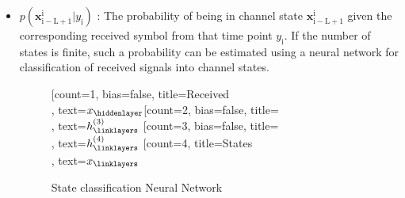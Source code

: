 \documentclass[12pt,a4paper]{report}
\begin{document}
\begin{itemize}
\item $p(\mathbf{x}_{\mathrm{i-L+1}}^{\mathrm{i}}|y_{\mathrm{i}})$
: The probability of being in channel state $\mathbf{x}_{\mathrm{i-L+1}}^{\mathrm{i}}$ given the corresponding received symbol from that time point $y_{\mathrm{i}}$. If the number of states is finite, such a probability can be estimated using a neural network for classification of received signals into channel states. 
	\begin{figure}[H]
	\centering
		\begin{neuralnetwork}[height=4, nodespacing=10mm, layerspacing=15mm]
		\newcommand{\x}[2]{$x_#2$}
		\newcommand{\y}[2]{$\hat{y}_#2$}
		\newcommand{\hfirst}[2]{\small $h^{(1)}_#2$}
		\newcommand{\hsecond}[2]{\small $h^{(2)}_#2$}
		\newcommand{\hthird}[2]{\small $h^{(3)}_#2$}
		\newcommand{\hfourth}[2]{\small $h^{(4)}_#2$}
		[count=1, bias=false, title=Received\\, text=\x]
		\hiddenlayer[count=2, bias=false, title=\\, text=\hthird] \linklayers
		\hiddenlayer[count=3, bias=false, title=\\, text=\hfourth] \linklayers
		\outputlayer[count=4, title=States\\, text=\x] \linklayers
	    \end{neuralnetwork}
	    	  	  \caption{State classification Neural Network}

	\end{figure}



\end{itemize}
\end{document}

